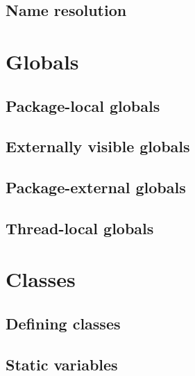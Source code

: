 \documentclass{article}
\begin{document}
\subsection{Name resolution}
\label{sub:scope:resolution}

\section{Globals}
\label{sec:globals}

\subsection{Package-local globals}
\label{sub:globals:local}

\subsection{Externally visible globals}
\label{sub:globals:visible}

\subsection{Package-external globals}
\label{sub:globals:extern}

\subsection{Thread-local globals}
\label{sub:globals:threadlocal}

\section{Classes}
\label{sec:classes}

\subsection{Defining classes}
\label{sub:classes:definition}

\subsection{Static variables}
\label{sub:classes:static}
\end{document}
